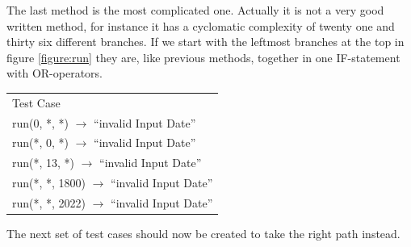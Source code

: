 \documentclass[a4paper]{article}
\begin{document}
The last method is the most complicated one. Actually it is not a very good written method, for instance it has a cyclomatic complexity of twenty one and thirty six different branches. If we start with the leftmost branches at the top in figure \ref{figure:run} they are, like previous methods, together in one IF-statement with OR-operators.

\begin{table}[h]
	\begin{tabular}{l}
		Test Case\\
		run(0, *, *) $\rightarrow$ ``invalid Input Date''\\
		run(*, 0, *) $\rightarrow$ ``invalid Input Date''\\
		run(*, 13, *) $\rightarrow$ ``invalid Input Date''\\
		run(*, *, 1800) $\rightarrow$ ``invalid Input Date''\\		
		run(*, *, 2022) $\rightarrow$ ``invalid Input Date''\\
	\end{tabular}
\end{table}

The next set of test cases should now be created to take the right path instead.
\end{document}
